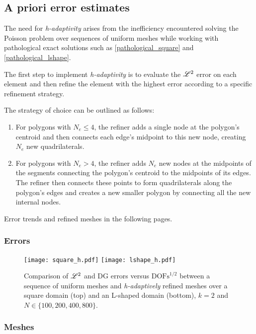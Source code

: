 \subsection{A priori error estimates}

The need for \textit{h-adaptivity} arises from the inefficiency encountered solving the Poisson problem over sequences of uniform meshes while working with pathological exact solutions such as \eqref{pathological_square} and \eqref{pathological_lshape}.

The first step to implement \textit{h-adaptivity} is to evaluate the $\mathscr{L}^2$ error on each element and then refine the element with the highest error according to a specific refinement strategy.

The strategy of choice can be outlined as follows:

\begin{enumerate}
    \item For polygons with $N_e \leq 4$, the refiner adds a single node at the polygon's centroid and then connects each edge's midpoint to this new node, creating $N_e$ new quadrilaterals.
    \item For polygons with $N_e > 4$, the refiner adds $N_e$ new nodes at the midpoints of the segments connecting the polygon's centroid to the midpoints of its edges. The refiner then connects these points to form quadrilaterals along the polygon's edges and creates a new smaller polygon by connecting all the new internal nodes.
\end{enumerate}

Error trends and refined meshes in the following pages.

\newpage
\subsubsection{Errors}

\begin{figure}[!ht]
	\centering
	\texttt{[image: square\_h.pdf]}
    \texttt{[image: lshape\_h.pdf]}
	\caption{Comparison of $\mathscr{L}^2$ and DG errors versus $\text{DOFs}^{1/2}$ between a sequence of uniform meshes and \textit{h-adaptively} refined meshes over a square domain (top) and an L-shaped domain (bottom), $k = 2$ and $N \in \{100, 200, 400, 800\}$.}
\end{figure}

\newpage
\subsubsection{Meshes}

